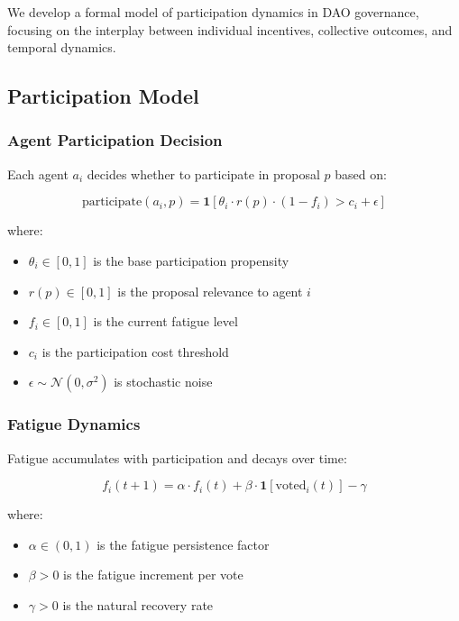 
We develop a formal model of participation dynamics in DAO governance, focusing on the interplay between individual incentives, collective outcomes, and temporal dynamics.

\subsection{Participation Model}

\subsubsection{Agent Participation Decision}

Each agent $a_i$ decides whether to participate in proposal $p$ based on:

\begin{equation}
\text{participate}(a_i, p) = \mathbf{1}\left[\theta_i \cdot r(p) \cdot (1 - f_i) > c_i + \epsilon\right]
\end{equation}

where:
\begin{itemize}
    \item $\theta_i \in [0, 1]$ is the base participation propensity
    \item $r(p) \in [0, 1]$ is the proposal relevance to agent $i$
    \item $f_i \in [0, 1]$ is the current fatigue level
    \item $c_i$ is the participation cost threshold
    \item $\epsilon \sim \mathcal{N}(0, \sigma^2)$ is stochastic noise
\end{itemize}

\subsubsection{Fatigue Dynamics}

Fatigue accumulates with participation and decays over time:

\begin{equation}
f_i(t+1) = \alpha \cdot f_i(t) + \beta \cdot \mathbf{1}[\text{voted}_i(t)] - \gamma
\end{equation}

where:
\begin{itemize}
    \item $\alpha \in (0, 1)$ is the fatigue persistence factor
    \item $\beta > 0$ is the fatigue increment per vote
    \item $\gamma > 0$ is the natural recovery rate
\end{itemize}

